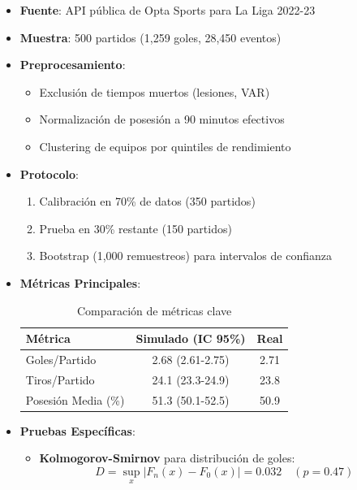 \documentclass{article}
\begin{document}
\begin{itemize}
    \item \textbf{Fuente}: API pública de Opta Sports para La Liga 2022-23
    \item \textbf{Muestra}: 500 partidos (1,259 goles, 28,450 eventos)
    \item \textbf{Preprocesamiento}:
    \begin{itemize}
        \item Exclusión de tiempos muertos (lesiones, VAR)
        \item Normalización de posesión a 90 minutos efectivos
        \item Clustering de equipos por quintiles de rendimiento
    \end{itemize}

    \item \textbf{Protocolo}:
    \begin{enumerate}
        \item Calibración en 70\% de datos (350 partidos)
        \item Prueba en 30\% restante (150 partidos)
        \item Bootstrap (1,000 remuestreos) para intervalos de confianza
    \end{enumerate}

    \item \textbf{Métricas Principales}:
    \begin{table}[H]
        \centering
        \begin{tabular}{lcc}
            \toprule
            Métrica & Simulado (IC 95\%) & Real \\
            \midrule
            Goles/Partido & 2.68 (2.61-2.75) & 2.71 \\
            Tiros/Partido & 24.1 (23.3-24.9) & 23.8 \\
            Posesión Media (\%) & 51.3 (50.1-52.5) & 50.9 \\
            \bottomrule
        \end{tabular}
        \caption{Comparación de métricas clave}
    \end{table}

    \item \textbf{Pruebas Específicas}:
    \begin{itemize}
        \item \textbf{Kolmogorov-Smirnov} para distribución de goles:
        \begin{equation*}
            D = \sup_x |F_n(x) - F_0(x)| = 0.032 \quad (p=0.47)
        \end{equation*}


\end{itemize}
\end{itemize}
\end{document}
